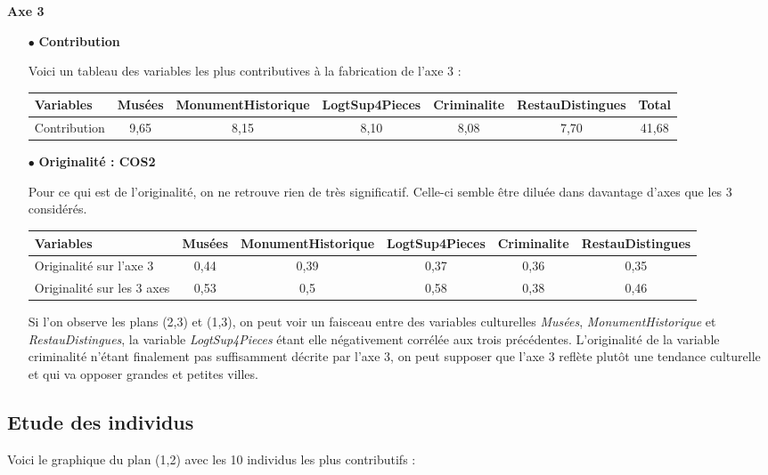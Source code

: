 \documentclass{article}
\begin{document}
\bigskip

{\large \textbf{Axe 3}}

\begin{itemize}
\item[$\bullet$] \textbf{Contribution}

Voici un tableau des variables les plus contributives à la fabrication de l'axe 3 : 

\begin{tabular}{|l|c|c|c|c|c|c|}
\hline 
Variables & Musées  & MonumentHistorique & LogtSup4Pieces & Criminalite & RestauDistingues & Total \\ 
\hline 
Contribution & 9,65 & 8,15 & 8,10 & 8,08 & 7,70 & 41,68 \\ 
\hline 
\end{tabular} 

\item[$\bullet$] \textbf{Originalité : COS2}

Pour ce qui est de l'originalité, on ne retrouve rien de très significatif. Celle-ci semble être diluée dans davantage d'axes que les 3 considérés. 

\begin{tabular}{|l|c|c|c|c|c|}
\hline 
Variables & Musées  & MonumentHistorique & LogtSup4Pieces & Criminalite & RestauDistingues \\ 
\hline 
Originalité sur l'axe 3 & 0,44 & 0,39 & 0,37 & 0,36 & 0,35  \\ 
\hline
Originalité sur les 3 axes & 0,53 & 0,5 & 0,58 & 0,38 & 0,46  \\ 
\hline  
\end{tabular} 

Si l'on observe les plans (2,3) et (1,3), on peut voir un faisceau entre des variables culturelles \emph{Musées}, \emph{MonumentHistorique} et \emph{RestauDistingues}, la variable \emph{LogtSup4Pieces} étant elle négativement corrélée aux trois précédentes. L'originalité de la variable criminalité n'étant finalement pas suffisamment décrite par l'axe 3, on peut supposer que l'axe 3 reflète plutôt une tendance culturelle et qui va opposer grandes et petites villes. 
\end{itemize}

\subsection{Etude des individus}

Voici le graphique du plan (1,2) avec les 10 individus les plus contributifs : 
\end{document}
